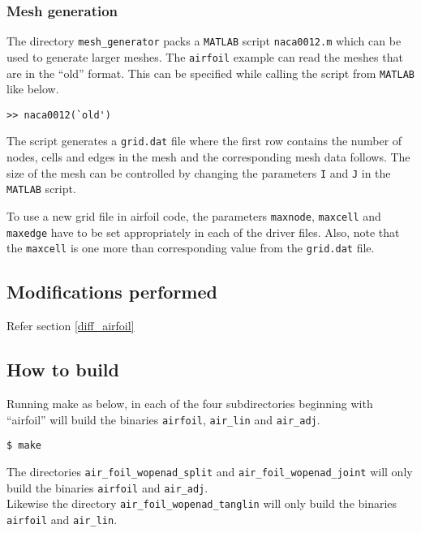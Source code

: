 \subsubsection{Mesh generation}\label{mesh_gen}
The directory \texttt{mesh\_generator} packs a \texttt{MATLAB} script \texttt{naca0012.m} which can be used to generate larger meshes. The \texttt{airfoil} example can read the meshes that are in the ``old'' format. This can be specified while calling the script from \texttt{MATLAB} like below.
\hfill\break
\begin{lstlisting}[language=mymatlab, numbers=none]
>> naca0012(`old')
\end{lstlisting}
The script generates a \texttt{grid.dat} file where the first row contains the number of nodes, cells and edges in the mesh and the corresponding mesh data follows. The size of the mesh can be controlled by changing the parameters \texttt{I} and \texttt{J} in the \texttt{MATLAB} script.

\begin{NotePar}
\noindent To use a new grid file in airfoil code, the parameters \texttt{maxnode}, \texttt{maxcell} and \texttt{maxedge} have to be set appropriately in each of the driver files. Also, note that the \texttt{maxcell} is one more than corresponding value from the \texttt{grid.dat} file.
\end{NotePar}
\subsection{Modifications performed}
Refer section \ref{diff_airfoil}
\subsection{How to build}
Running make as below, in each of the four subdirectories beginning with ``airfoil'' will build the  binaries \texttt{airfoil}, \texttt{air\_lin} and \texttt{air\_adj}.
\hfill\break
\begin{lstlisting}[language=mybash, numbers=none]
    $ make
\end{lstlisting}
\begin{NotePar}
\noindent  The directories \texttt{air\_foil\_wopenad\_split} and \texttt{air\_foil\_wopenad\_joint} will only build the binaries \texttt{airfoil} and \texttt{air\_adj}.\\

\noindent Likewise the directory \texttt{air\_foil\_wopenad\_tanglin} will only build the binaries \texttt{airfoil} and \texttt{air\_lin}.
\end{NotePar}
